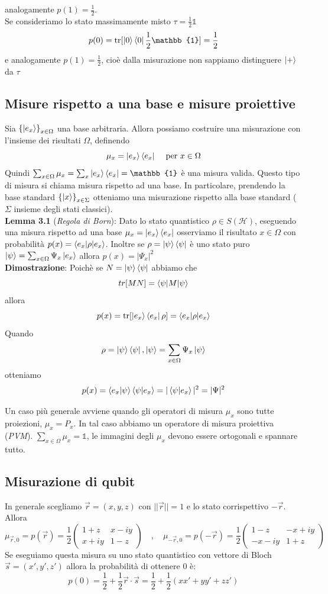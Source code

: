 \documentclass{report}
\begin{document}
analogamente $p(1) = \frac{1}{2}$.
\\Se consideriamo lo stato massimamente misto $\tau = \frac{1}{2}\mathbb{1}$
$$p(0)=\text{tr}[\ket{0}\bra{0}\frac{1}{2}\mathbb{1}] = \frac{1}{2}$$
e analogamente $p(1) = \frac{1}{2}$, cioè dalla misurazione non sappiamo distinguere $\ket{+}$ da $\tau$
\subsection{Misure rispetto a una base e misure proiettive}
Sia $\left\{\ket{e_x} \right\}_{x\in \Omega}$ una base arbitraria. Allora possiamo costruire una misurazione con l'insieme dei risultati $\Omega$, definendo
$$
    \mu_x = \ket{e_x}\bra{e_x} \hspace{0.3cm}\text{ per } x \in \Omega
$$
Quindi $\sum_{x\in\Omega}\mu_x = \sum_x \ket{e_x}\bra{e_x} = \mathbb{1}$ è una misura valida. Questo tipo di misura si chiama misura rispetto ad una base. In particolare, prendendo la base standard $\left\{ \ket{x} \right\}_{x\in\Sigma}$ otteniamo una misurazione rispetto alla base standard ($\Sigma$ insieme degli stati classici).
\medskip
\\ \textbf{Lemma 3.1} (\textit{Regola di Born}): Dato lo stato quantistico $\rho \in S(\mathcal{H})$, eseguendo una misura rispetto ad una base $\mu_x=\ket{e_x}\bra{e_x}$ osserviamo il risultato $x\in\Omega$ con probabilità $p(x)=\braket{e_x|\rho|e_x}$. Inoltre se $\rho = \ket{\psi}\bra{\psi}$ è uno stato puro $\ket{\psi}= \sum_{x\in\Omega}\Psi_x\ket{e_x}$ allora $p(x)=|\Psi_x|^2$
\medskip
\\ \textbf{Dimostrazione}: Poichè se $N = \ket{\psi}\bra{\psi}$ abbiamo che $$tr[MN]=\braket{\psi|M|\psi}$$ allora
$$p(x)= \text{tr}[\ket{e_x}\bra{e_x}\rho]=\braket{e_x|\rho|e_x}$$
Quando $$\rho = \ket{\psi}\bra{\psi}, \ket{\psi} = \sum_{x\in\Omega}\Psi_x\ket{\psi}$$ otteniamo $$p(x)=\braket{e_x|\psi} \braket{\psi|e_x}= |\braket{\psi|e_x}|^2=|\Psi|^2$$

Un caso più generale avviene quando gli operatori di misura $\mu_x$ sono tutte proiezioni, $\mu_x=P_x$. In tal caso abbiamo un operatore di misura proiettiva (\textit{PVM}). $\sum_{x\in\Omega}\mu_x = \mathbb{1}$, le immagini degli $\mu_x$ devono essere ortogonali e spannare tutto.
\subsection{Misurazione di qubit}
In generale scegliamo $\vec{r}=(x,y,z)$ con $||\vec{r}||=1$ e lo stato corrispettivo $-\vec{r}$. Allora 
$$\mu_{\vec{r},0}=p(\vec{r})=\frac{1}{2}
\begin{pmatrix}
    1+z & x-iy\\
    x+iy & 1-z
\end{pmatrix}\quad,\quad 
\mu_{-\vec{r},0}=p(-\vec{r})=\frac{1}{2}
\begin{pmatrix}
    1-z & -x+iy\\
    -x-iy & 1+z
\end{pmatrix}
$$
Se eseguiamo questa misura su uno stato quantistico con vettore di Bloch $\vec{s}=(x',y',z')$ allora la probabilità di ottenere $0$ è: $$p(0)= \frac{1}{2}+\frac{1}{2}\vec{r}\cdot\vec{s}=\frac{1}{2}+\frac{1}{2}(xx'+yy'+zz')$$ 
\end{document}
